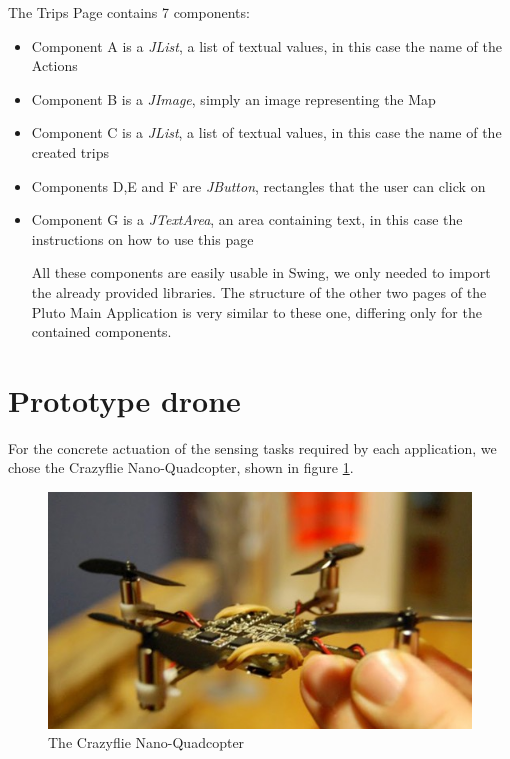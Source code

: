 The Trips Page contains 7 components:

\begin{itemize}
\item {Component A is a \textit{JList}, a list of textual values, in this case the name of the Actions}
\item {Component B is a \textit{JImage}, simply an image representing the Map}
\item {Component C is a \textit{JList}, a list of textual values, in this case the name of the created trips}
\item {Components D,E and F are \textit{JButton}, rectangles that the user can click on}
\item {Component G is a \textit{JTextArea}, an area containing text, in this case the instructions on how to use this page}

All these components are easily usable in Swing, we only needed to import the already provided libraries.
The structure of the other two pages of the Pluto Main Application is very similar to these one, differing only for the contained components.

\end{itemize}


\section{Prototype drone}\label{crazyflie}

For the concrete actuation of the sensing tasks required by each application, we chose the Crazyflie Nano-Quadcopter, shown in figure \ref{fig:crazyflie}.


\begin{figure}[H]
\centering
\includegraphics[width=\linewidth]
{pictures/crazyflie.jpg}
  \caption{The Crazyflie Nano-Quadcopter}
  \label{fig:crazyflie}
\end{figure}

